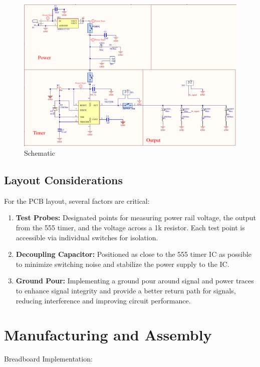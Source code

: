 \documentclass[a4paper,11pt]{article}%
\begin{document}
\begin{figure}[H]
	\centering
	\includegraphics[scale=0.4]{figures/overall_sch.png}
	\caption{Schematic}
\end{figure}


\subsection{Layout Considerations}
For the PCB layout, several factors are critical:

\begin{enumerate}
	\item \textbf{Test Probes:} Designated points for measuring power rail voltage, the output from the 555 timer, and the voltage across a 1k resistor. Each test point is accessible via individual switches for isolation.
	\item \textbf{Decoupling Capacitor:} Positioned as close to the 555 timer IC as possible to minimize switching noise and stabilize the power supply to the IC.
	\item \textbf{Ground Pour:} Implementing a ground pour around signal and power traces to enhance signal integrity and provide a better return path for signals, reducing interference and improving circuit performance.
\end{enumerate}


\pagebreak
\section{Manufacturing and Assembly}

Breadboard Implementation:
\end{document}
